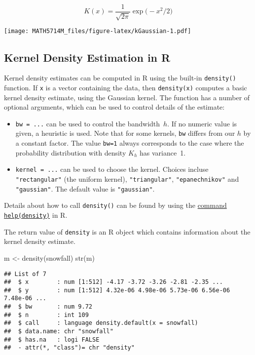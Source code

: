 \documentclass[
  a4paper,
]{article}
\newenvironment{Shaded}{\begin{snugshade}}{\end{snugshade}}
\newcommand{\FunctionTok}[1]{\textcolor[rgb]{0.00,0.00,0.00}{#1}}
\newcommand{\NormalTok}[1]{#1}
\newcommand{\OtherTok}[1]{\textcolor[rgb]{0.56,0.35,0.01}{#1}}
\theoremstyle{definition}
\theoremstyle{definition}
\theoremstyle{definition}
\theoremstyle{definition}
\theoremstyle{remark}
\begin{document}
\begin{equation*}
  K(x)
  = \frac{1}{\sqrt{2\pi}} \exp\bigl(-x^2/2\bigr)
\end{equation*}

\texttt{[image: MATH5714M\_files/figure-latex/kGaussian-1.pdf]}

\hypertarget{kernel-density-estimation-in-r}{%
\subsection{Kernel Density Estimation in R}\label{kernel-density-estimation-in-r}}

Kernel density estimates can be computed in R using the built-in
\texttt{density()} function. If \texttt{x} is a vector containing the data, then
\texttt{density(x)} computes a basic kernel density estimate, using the
Gaussian kernel. The function has a number of optional arguments,
which can be used to control details of the estimate:

\begin{itemize}
\item
  \texttt{bw\ =\ ...} can be used to control the bandwidth~\(h\).
  If no numeric value is given, a heuristic is used.
  Note that for some kernels, \texttt{bw} differs from our \(h\)
  by a constant factor. The value \texttt{bw=1} always corresponds
  to the case where the probability distribution with density
  \(K_h\) has variance~1.
\item
  \texttt{kernel\ =\ ...} can be used to choose the kernel.
  Choices incluse \texttt{"rectangular"} (the uniform kernel), \texttt{"triangular"},
  \texttt{"epanechnikov"} and \texttt{"gaussian"}. The default value is \texttt{"gaussian"}.
\end{itemize}

Details about how to call \texttt{density()} can be found by using the
\href{https://rdrr.io/r/stats/density.html}{command \texttt{help(density)}} in R.

The return value of \texttt{density} is an R object which contains information
about the kernel density estimate.

\begin{Shaded}
\begin{Highlighting}[]
\NormalTok{m }\OtherTok{\textless{}{-}} \FunctionTok{density}\NormalTok{(snowfall)}
\FunctionTok{str}\NormalTok{(m)}
\end{Highlighting}
\end{Shaded}

\begin{verbatim}
## List of 7
##  $ x        : num [1:512] -4.17 -3.72 -3.26 -2.81 -2.35 ...
##  $ y        : num [1:512] 4.32e-06 4.98e-06 5.73e-06 6.56e-06 7.48e-06 ...
##  $ bw       : num 9.72
##  $ n        : int 109
##  $ call     : language density.default(x = snowfall)
##  $ data.name: chr "snowfall"
##  $ has.na   : logi FALSE
##  - attr(*, "class")= chr "density"
\end{verbatim}
\end{document}
